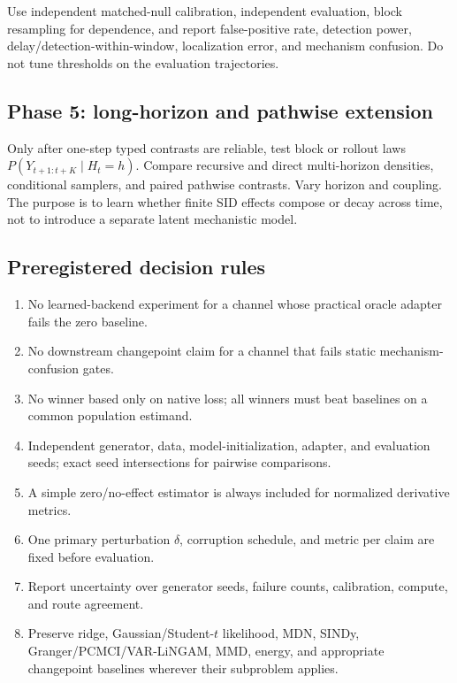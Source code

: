 \documentclass[10pt]{article}
\begin{document}
Use independent matched-null calibration, independent evaluation, block resampling for dependence, and report false-positive rate, detection power, delay/detection-within-window, localization error, and mechanism confusion. Do not tune thresholds on the evaluation trajectories.

\subsection{Phase 5: long-horizon and pathwise extension}

Only after one-step typed contrasts are reliable, test block or rollout laws \(P(Y_{t+1:t+K}\mid H_t=h)\). Compare recursive and direct multi-horizon densities, conditional samplers, and paired pathwise contrasts. Vary horizon and coupling. The purpose is to learn whether finite SID effects compose or decay across time, not to introduce a separate latent mechanistic model.

\subsection{Preregistered decision rules}

\begin{enumerate}
  \item No learned-backend experiment for a channel whose practical oracle adapter fails the zero baseline.
  \item No downstream changepoint claim for a channel that fails static mechanism-confusion gates.
  \item No winner based only on native loss; all winners must beat baselines on a common population estimand.
  \item Independent generator, data, model-initialization, adapter, and evaluation seeds; exact seed intersections for pairwise comparisons.
  \item A simple zero/no-effect estimator is always included for normalized derivative metrics.
  \item One primary perturbation \(\delta\), corruption schedule, and metric per claim are fixed before evaluation.
  \item Report uncertainty over generator seeds, failure counts, calibration, compute, and route agreement.
  \item Preserve ridge, Gaussian/Student-\(t\) likelihood, MDN, SINDy, Granger/PCMCI/VAR-LiNGAM, MMD, energy, and appropriate changepoint baselines wherever their subproblem applies.
\end{enumerate}
\end{document}
